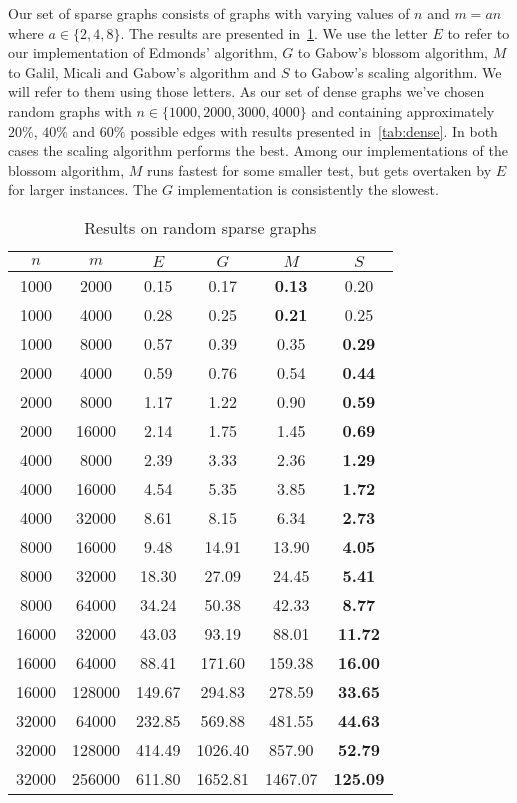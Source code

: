 Our set of sparse graphs consists of graphs with varying values of $n$ and $m = a n$ where $a \in \{2, 4, 8 \}$. The results are presented in~\ref{tab:sparse}. We use the letter $E$ to refer to our implementation of Edmonds' algorithm, $G$ to Gabow's blossom algorithm, $M$ to Galil, Micali and Gabow's algorithm and $S$ to Gabow's scaling algorithm. We will refer to them using those letters. 
As our set of dense graphs we've chosen random graphs with $n \in \{ 1000, 2000, 3000, 4000 \}$ and containing approximately $20\%$, $40\%$ and $60\%$ possible edges with results presented in~\ref{tab:dense}. In both cases the scaling algorithm performs the best. Among our implementations of the blossom algorithm, $M$ runs fastest for some smaller test, but gets overtaken by $E$ for larger instances. The $G$ implementation is consistently the slowest.

\begin{table}
\centering
\begin{tabular}{cc|cccc}
$n$ & $m$ & $E$ & $G$ & $M$ & $S$ \\
\hline
1000 & 2000 & 0.15 & 0.17 & \textbf{0.13} & 0.20 \\
1000 & 4000 & 0.28 & 0.25 & \textbf{0.21} & 0.25 \\
1000 & 8000 & 0.57 & 0.39 & 0.35 & \textbf{0.29} \\
2000 & 4000 & 0.59 & 0.76 & 0.54 & \textbf{0.44} \\
2000 & 8000 & 1.17 & 1.22 & 0.90 & \textbf{0.59} \\
2000 & 16000 & 2.14 & 1.75 & 1.45 & \textbf{0.69} \\
4000 & 8000 & 2.39 & 3.33 & 2.36 & \textbf{1.29} \\
4000 & 16000 & 4.54 & 5.35 & 3.85 & \textbf{1.72} \\
4000 & 32000 & 8.61 & 8.15 & 6.34 & \textbf{2.73} \\
8000 & 16000 & 9.48 & 14.91 & 13.90 & \textbf{4.05} \\
8000 & 32000 & 18.30 & 27.09 & 24.45 & \textbf{5.41} \\
8000 & 64000 & 34.24 & 50.38 & 42.33 & \textbf{8.77} \\
16000 & 32000 & 43.03 & 93.19 & 88.01 & \textbf{11.72} \\
16000 & 64000 & 88.41 & 171.60 & 159.38 & \textbf{16.00} \\
16000 & 128000 & 149.67 & 294.83 & 278.59 & \textbf{33.65} \\
32000 & 64000 & 232.85 & 569.88 & 481.55 & \textbf{44.63} \\
32000 & 128000 & 414.49 & 1026.40 & 857.90 & \textbf{52.79} \\
32000 & 256000 & 611.80 & 1652.81 & 1467.07 & \textbf{125.09} \\
\end{tabular}
\caption{Results on random sparse graphs}\label{tab:sparse}
\end{table}

